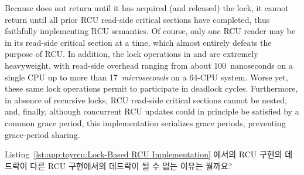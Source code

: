 Because  does not return until it has acquired
(and released) the lock, it cannot return until all prior RCU read-side
critical sections have completed, thus faithfully implementing
RCU semantics.
Of course, only one RCU reader may be in its read-side critical section
at a time, which almost entirely defeats the purpose of RCU.
In addition, the lock operations in  and
 are extremely heavyweight,
with read-side overhead ranging from about 100~nanoseconds on a single 
CPU up to more than 17~\emph{microseconds} on a 64-CPU system.
Worse yet,
these same lock operations permit 
to participate in deadlock cycles.
Furthermore, in absence of recursive locks,
RCU read-side critical sections cannot be nested, and, finally,
although concurrent RCU updates could in principle be satisfied by
a common grace period, this implementation serializes grace periods,
preventing grace-period sharing.
\fi

\QuickQuiz{}
	Listing~\ref{lst:app:toyrcu:Lock-Based RCU Implementation} 에서의 RCU 구현의
	데드락이 다른 RCU 구현에서의 데드락이 될 수 없는 이유는 뭘까요?
	\iffalse

